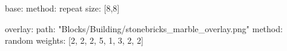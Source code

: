 base:
  method: repeat
  size: [8,8]

  overlay:
  path: "Blocks/Building/stonebricks_marble_overlay.png"
  method: random
  weights: [2, 2, 2, 5, 1, 3, 2, 2]